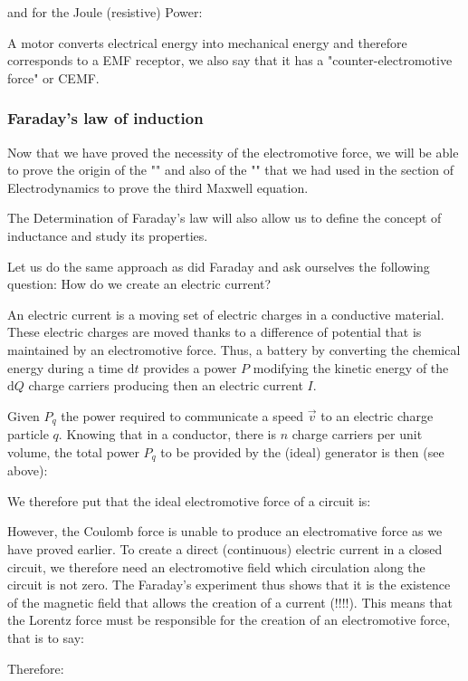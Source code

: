 	and for the Joule (resistive) Power:
	
	A motor converts electrical energy into mechanical energy and therefore corresponds to a EMF receptor, we also say that it has a "counter-electromotive force" or CEMF.
	
	\subsubsection{Faraday's law of induction}
	Now that we have proved the necessity of the electromotive force, we will be able to prove the origin of the "" and also of the "" that we had used in the section of Electrodynamics to prove the third Maxwell equation. 

	The Determination of Faraday's law will also allow us to define the concept of inductance and study its properties.

	Let us do the same approach as did Faraday and ask ourselves the following question: How do we create an electric current?

	An electric current is a moving set of electric charges in a conductive material. These electric charges are moved thanks to a difference of potential that is maintained by an electromotive force. Thus, a battery by converting the chemical energy during a time $\mathrm{d}t$ provides a power $P$ modifying the kinetic energy of the $\mathrm{d}Q$ charge carriers producing then an electric current $I$.

	Given $P_q$ the power required to communicate a speed $\vec{v}$ to an electric charge particle $q$. Knowing that in a conductor, there is $n$ charge carriers per unit volume, the total power $P_q$ to be provided by the (ideal) generator is then (see above):
	
	We therefore put that the ideal electromotive force of a circuit is:
	
	However, the Coulomb force is unable to produce an electromative force as we have proved earlier. To create a direct (continuous) electric current in a closed circuit, we therefore need an electromotive field which circulation along the circuit is not zero. The Faraday's experiment thus shows that it is the existence of the magnetic field that allows the creation of a current (!!!!). This means that the Lorentz force must be responsible for the creation of an electromotive force, that is to say:
	
	Therefore:
	
